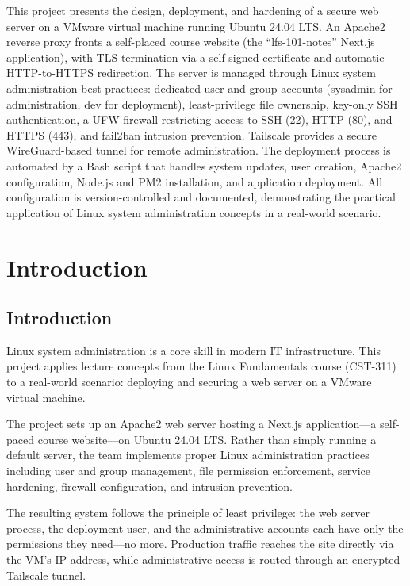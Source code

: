 \documentclass[12pt,a4paper]{report}
\begin{document}
\indent This project presents the design, deployment, and hardening of a secure web server on a VMware virtual machine running Ubuntu 24.04 LTS. An Apache2 reverse proxy fronts a self-placed course website (the ``lfs-101-notes'' Next.js application), with TLS termination via a self-signed certificate and automatic HTTP-to-HTTPS redirection. The server is managed through Linux system administration best practices: dedicated user and group accounts (sysadmin for administration, dev for deployment), least-privilege file ownership, key-only SSH authentication, a UFW firewall restricting access to SSH (22), HTTP (80), and HTTPS (443), and fail2ban intrusion prevention. Tailscale provides a secure WireGuard-based tunnel for remote administration. The deployment process is automated by a Bash script that handles system updates, user creation, Apache2 configuration, Node.js and PM2 installation, and application deployment. All configuration is version-controlled and documented, demonstrating the practical application of Linux system administration concepts in a real-world scenario.

\vfill
\clearpage
\newpage

\setcounter{page}{1}

\chapter{Introduction}
\section{Introduction}

\indent Linux system administration is a core skill in modern IT infrastructure. This project applies lecture concepts from the Linux Fundamentals course (CST-311) to a real-world scenario: deploying and securing a web server on a VMware virtual machine.

The project sets up an Apache2 web server hosting a Next.js application---a self-paced course website---on Ubuntu 24.04 LTS. Rather than simply running a default server, the team implements proper Linux administration practices including user and group management, file permission enforcement, service hardening, firewall configuration, and intrusion prevention.

The resulting system follows the principle of least privilege: the web server process, the deployment user, and the administrative accounts each have only the permissions they need---no more. Production traffic reaches the site directly via the VM's IP address, while administrative access is routed through an encrypted Tailscale tunnel.
\end{document}
